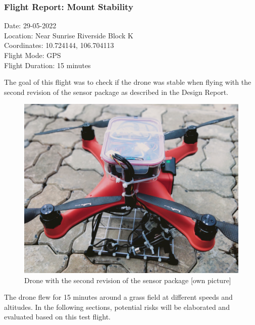 \newpage
\subsubsection{Flight Report: Mount Stability}
\begin{minipage}{1\textwidth}
	\begin{flushright}
		Date: 29-05-2022\\
		Location: Near Sunrise Riverside Block K\\
		Coordinates: 10.724144, 106.704113\\
		Flight Mode: \gls{GPS}\\
		Flight Duration: 15 minutes\\\vspace{5mm}
	\end{flushright}
\end{minipage}

The goal of this flight was to check if the drone was stable when flying with the second revision of the sensor package as described in the Design Report. \cite{designreport}

\begin{figure}[h]
\centering
\includegraphics[scale=0.4]{080_testing/flights/21_drone.jpg}
\caption{Drone with the second revision of the sensor package [own picture]}
\end{figure}

The drone flew for 15 minutes around a grass field at different speeds and altitudes. In the following sections, potential risks will be elaborated and evaluated based on this test flight.

